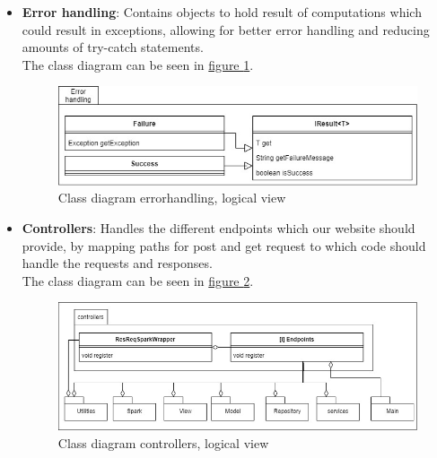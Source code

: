 \begin{itemize}
    \item \textbf{Error handling}: Contains objects to hold result of computations which could result in exceptions, allowing for better error handling and reducing amounts of try-catch statements. \\
    The class diagram can be seen in \hyperref[fig:classDiagramErrorhandling]{figure \ref{fig:classDiagramErrorhandling}}.
    \begin{figure}[H]
        \centering
        \includegraphics[width=1.0\textwidth]{images/class_diagram_errorhandling.jpg}
        \caption{Class diagram errorhandling, logical view}
        \label{fig:classDiagramErrorhandling}
    \end{figure}
    
    \item \textbf{Controllers}: Handles the different endpoints which our website should provide, by mapping paths for post and get request to which code should handle the requests and responses.\\
    The class diagram can be seen in \hyperref[fig:classDiagramControllers]{figure \ref{fig:classDiagramControllers}}.
    \begin{figure}[H]
        \centering
        \includegraphics[width=1.0\textwidth]{images/class_diagram_controllers.jpg}
        \caption{Class diagram controllers, logical view}
        \label{fig:classDiagramControllers}
    \end{figure}
    

\end{itemize}

